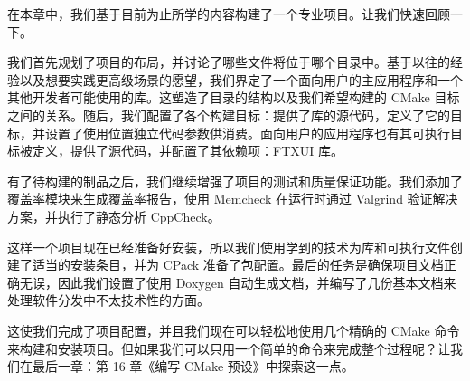 在本章中，我们基于目前为止所学的内容构建了一个专业项目。让我们快速回顾一下。

我们首先规划了项目的布局，并讨论了哪些文件将位于哪个目录中。基于以往的经验以及想要实践更高级场景的愿望，我们界定了一个面向用户的主应用程序和一个其他开发者可能使用的库。这塑造了目录的结构以及我们希望构建的 CMake 目标之间的关系。随后，我们配置了各个构建目标：提供了库的源代码，定义了它的目标，并设置了使用位置独立代码参数供消费。面向用户的应用程序也有其可执行目标被定义，提供了源代码，并配置了其依赖项：FTXUI 库。

有了待构建的制品之后，我们继续增强了项目的测试和质量保证功能。我们添加了覆盖率模块来生成覆盖率报告，使用 Memcheck 在运行时通过 Valgrind 验证解决方案，并执行了静态分析 CppCheck。

这样一个项目现在已经准备好安装，所以我们使用学到的技术为库和可执行文件创建了适当的安装条目，并为 CPack 准备了包配置。最后的任务是确保项目文档正确无误，因此我们设置了使用 Doxygen 自动生成文档，并编写了几份基本文档来处理软件分发中不太技术性的方面。

这使我们完成了项目配置，并且我们现在可以轻松地使用几个精确的 CMake 命令来构建和安装项目。但如果我们可以只用一个简单的命令来完成整个过程呢？让我们在最后一章：第 16 章《编写 CMake 预设》中探索这一点。